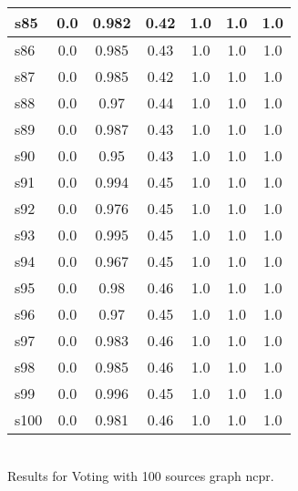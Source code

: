 \documentclass{article}
\begin{document}
\begin{tabular}{|l|c|c|c|c|c|c|}
\hline
s85 &0.0 & 0.982 & 0.42 & 1.0 & 1.0 & 1.0\\
\hline
s86 &0.0 & 0.985 & 0.43 & 1.0 & 1.0 & 1.0\\
\hline
s87 &0.0 & 0.985 & 0.42 & 1.0 & 1.0 & 1.0\\
\hline
s88 &0.0 & 0.97 & 0.44 & 1.0 & 1.0 & 1.0\\
\hline
s89 &0.0 & 0.987 & 0.43 & 1.0 & 1.0 & 1.0\\
\hline
s90 &0.0 & 0.95 & 0.43 & 1.0 & 1.0 & 1.0\\
\hline
s91 &0.0 & 0.994 & 0.45 & 1.0 & 1.0 & 1.0\\
\hline
s92 &0.0 & 0.976 & 0.45 & 1.0 & 1.0 & 1.0\\
\hline
s93 &0.0 & 0.995 & 0.45 & 1.0 & 1.0 & 1.0\\
\hline
s94 &0.0 & 0.967 & 0.45 & 1.0 & 1.0 & 1.0\\
\hline
s95 &0.0 & 0.98 & 0.46 & 1.0 & 1.0 & 1.0\\
\hline
s96 &0.0 & 0.97 & 0.45 & 1.0 & 1.0 & 1.0\\
\hline
s97 &0.0 & 0.983 & 0.46 & 1.0 & 1.0 & 1.0\\
\hline
s98 &0.0 & 0.985 & 0.46 & 1.0 & 1.0 & 1.0\\
\hline
s99 &0.0 & 0.996 & 0.45 & 1.0 & 1.0 & 1.0\\
\hline
s100 &0.0 & 0.981 & 0.46 & 1.0 & 1.0 & 1.0\\
\hline
\end{tabular}\\

\noindent Results for Voting with 100 sources graph ncpr.
\end{document}
